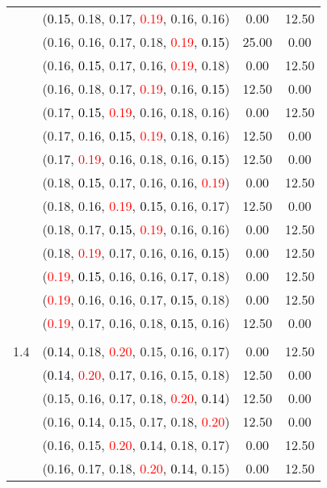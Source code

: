 \documentclass[10pt,a4paper]{report}
\begin{document}
\begin{center}
\begin{longtable}{clcc}
			&(\textcolor{black}{0.15}, 0.18, 0.17, \textcolor{red}{0.19}, 0.16, 0.16)&0.00&12.50\\
			&(0.16, 0.16, 0.17, 0.18, \textcolor{red}{0.19}, \textcolor{black}{0.15})&25.00&0.00\\
			&(0.16, \textcolor{black}{0.15}, 0.17, 0.16, \textcolor{red}{0.19}, 0.18)&0.00&12.50\\
			&(0.16, 0.18, 0.17, \textcolor{red}{0.19}, 0.16, \textcolor{black}{0.15})&12.50&0.00\\
			&(0.17, \textcolor{black}{0.15}, \textcolor{red}{0.19}, 0.16, 0.18, 0.16)&0.00&12.50\\
			&(0.17, 0.16, \textcolor{black}{0.15}, \textcolor{red}{0.19}, 0.18, 0.16)&12.50&0.00\\
			&(0.17, \textcolor{red}{0.19}, 0.16, 0.18, 0.16, \textcolor{black}{0.15})&12.50&0.00\\
			&(0.18, \textcolor{black}{0.15}, 0.17, 0.16, 0.16, \textcolor{red}{0.19})&0.00&12.50\\
			&(0.18, 0.16, \textcolor{red}{0.19}, \textcolor{black}{0.15}, 0.16, 0.17)&12.50&0.00\\
			&(0.18, 0.17, \textcolor{black}{0.15}, \textcolor{red}{0.19}, 0.16, 0.16)&0.00&12.50\\
			&(0.18, \textcolor{red}{0.19}, 0.17, 0.16, 0.16, \textcolor{black}{0.15})&0.00&12.50\\
			&(\textcolor{red}{0.19}, \textcolor{black}{0.15}, 0.16, 0.16, 0.17, 0.18)&0.00&12.50\\
			&(\textcolor{red}{0.19}, 0.16, 0.16, 0.17, \textcolor{black}{0.15}, 0.18)&0.00&12.50\\
			&(\textcolor{red}{0.19}, 0.17, 0.16, 0.18, \textcolor{black}{0.15}, 0.16)&12.50&0.00\\
		&&&\\
		1.4			&(\textcolor{black}{0.14}, 0.18, \textcolor{red}{0.20}, 0.15, 0.16, 0.17)&0.00&12.50\\
			&(\textcolor{black}{0.14}, \textcolor{red}{0.20}, 0.17, 0.16, 0.15, 0.18)&12.50&0.00\\
			&(0.15, 0.16, 0.17, 0.18, \textcolor{red}{0.20}, \textcolor{black}{0.14})&12.50&0.00\\
			&(0.16, \textcolor{black}{0.14}, 0.15, 0.17, 0.18, \textcolor{red}{0.20})&12.50&0.00\\
			&(0.16, 0.15, \textcolor{red}{0.20}, \textcolor{black}{0.14}, 0.18, 0.17)&0.00&12.50\\
			&(0.16, 0.17, 0.18, \textcolor{red}{0.20}, \textcolor{black}{0.14}, 0.15)&0.00&12.50\\

\end{longtable}
\end{center}
\end{document}

